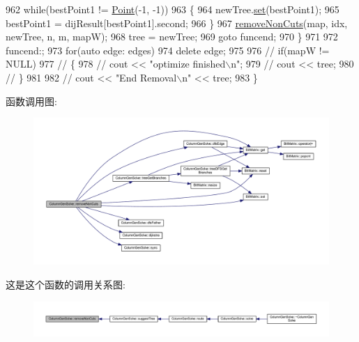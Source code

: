 \begin{DoxyCode}
962             \textcolor{keywordflow}{while}(bestPoint1 != \hyperlink{classPoint}{Point}(-1, -1))
963             \{
964                 newTree.\hyperlink{classBitMatrix_ad26dd2e93e9d24d70834d6d79e29c81e}{set}(bestPoint1);
965                 bestPoint1 = dijResult[bestPoint1].second;
966             \}
967             \hyperlink{classColumnGenSolve_a6c08d317e692a357d49ee56184a9db22}{removeNonCuts}(map, idx, newTree, n, m, mapW);
968             tree = newTree;
969             \textcolor{keywordflow}{goto} funcend;
970         \}
971     
972     funcend:;
973     \textcolor{keywordflow}{for}(\textcolor{keyword}{auto} edge: edges)
974         \textcolor{keyword}{delete} edge;
975     
976     \textcolor{comment}{// if(mapW != NULL)}
977     \textcolor{comment}{// \{}
978         \textcolor{comment}{// cout << "optimize finished\(\backslash\)n";}
979         \textcolor{comment}{// cout << tree;}
980     \textcolor{comment}{// \}}
981 
982     \textcolor{comment}{// cout << "End Removal\(\backslash\)n" << tree;}
983 \}
\end{DoxyCode}


函数调用图\+:
\nopagebreak
\begin{figure}[H]
\begin{center}
\leavevmode
\includegraphics[width=350pt]{classColumnGenSolve_a6c08d317e692a357d49ee56184a9db22_cgraph}
\end{center}
\end{figure}




这是这个函数的调用关系图\+:
\nopagebreak
\begin{figure}[H]
\begin{center}
\leavevmode
\includegraphics[width=350pt]{classColumnGenSolve_a6c08d317e692a357d49ee56184a9db22_icgraph}
\end{center}
\end{figure}



